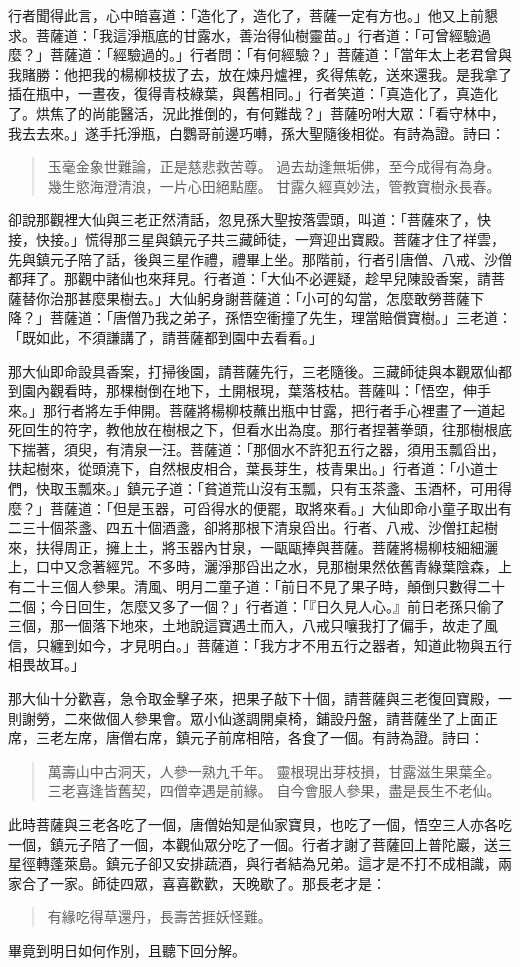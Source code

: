 行者聞得此言，心中暗喜道：「造化了，造化了，菩薩一定有方也。」他又上前懇求。菩薩道：「我這淨瓶底的甘露水，善治得仙樹靈苗。」行者道：「可曾經驗過麼？」菩薩道：「經驗過的。」行者問：「有何經驗？」菩薩道：「當年太上老君曾與我賭勝：他把我的楊柳枝拔了去，放在煉丹爐裡，炙得焦乾，送來還我。是我拿了插在瓶中，一晝夜，復得青枝綠葉，與舊相同。」行者笑道：「真造化了，真造化了。烘焦了的尚能醫活，況此推倒的，有何難哉？」菩薩吩咐大眾：「看守林中，我去去來。」遂手托淨瓶，白鸚哥前邊巧囀，孫大聖隨後相從。有詩為證。詩曰：
\begin{quote}
玉毫金象世難論，正是慈悲救苦尊。
過去劫逢無垢佛，至今成得有為身。
幾生慾海澄清浪，一片心田絕點塵。
甘露久經真妙法，管教寶樹永長春。
\end{quote}

卻說那觀裡大仙與三老正然清話，忽見孫大聖按落雲頭，叫道：「菩薩來了，快接，快接。」慌得那三星與鎮元子共三藏師徒，一齊迎出寶殿。菩薩才住了祥雲，先與鎮元子陪了話，後與三星作禮，禮畢上坐。那階前，行者引唐僧、八戒、沙僧都拜了。那觀中諸仙也來拜見。行者道：「大仙不必遲疑，趁早兒陳設香案，請菩薩替你治那甚麼果樹去。」大仙躬身謝菩薩道：「小可的勾當，怎麼敢勞菩薩下降？」菩薩道：「唐僧乃我之弟子，孫悟空衝撞了先生，理當賠償寶樹。」三老道：「既如此，不須謙講了，請菩薩都到園中去看看。」

那大仙即命設具香案，打掃後園，請菩薩先行，三老隨後。三藏師徒與本觀眾仙都到園內觀看時，那棵樹倒在地下，土開根現，葉落枝枯。菩薩叫：「悟空，伸手來。」那行者將左手伸開。菩薩將楊柳枝蘸出瓶中甘露，把行者手心裡畫了一道起死回生的符字，教他放在樹根之下，但看水出為度。那行者捏著拳頭，往那樹根底下揣著，須臾，有清泉一汪。菩薩道：「那個水不許犯五行之器，須用玉瓢舀出，扶起樹來，從頭澆下，自然根皮相合，葉長芽生，枝青果出。」行者道：「小道士們，快取玉瓢來。」鎮元子道：「貧道荒山沒有玉瓢，只有玉茶盞、玉酒杯，可用得麼？」菩薩道：「但是玉器，可舀得水的便罷，取將來看。」大仙即命小童子取出有二三十個茶盞、四五十個酒盞，卻將那根下清泉舀出。行者、八戒、沙僧扛起樹來，扶得周正，擁上土，將玉器內甘泉，一甌甌捧與菩薩。菩薩將楊柳枝細細灑上，口中又念著經咒。不多時，灑淨那舀出之水，見那樹果然依舊青綠葉陰森，上有二十三個人參果。清風、明月二童子道：「前日不見了果子時，顛倒只數得二十二個；今日回生，怎麼又多了一個？」行者道：「『日久見人心。』前日老孫只偷了三個，那一個落下地來，土地說這寶遇土而入，八戒只嚷我打了偏手，故走了風信，只纏到如今，才見明白。」菩薩道：「我方才不用五行之器者，知道此物與五行相畏故耳。」

那大仙十分歡喜，急令取金擊子來，把果子敲下十個，請菩薩與三老復回寶殿，一則謝勞，二來做個人參果會。眾小仙遂調開桌椅，鋪設丹盤，請菩薩坐了上面正席，三老左席，唐僧右席，鎮元子前席相陪，各食了一個。有詩為證。詩曰：
\begin{quote}
萬壽山中古洞天，人參一熟九千年。
靈根現出芽枝損，甘露滋生果葉全。
三老喜逢皆舊契，四僧幸遇是前緣。
自今會服人參果，盡是長生不老仙。
\end{quote}

此時菩薩與三老各吃了一個，唐僧始知是仙家寶貝，也吃了一個，悟空三人亦各吃一個，鎮元子陪了一個，本觀仙眾分吃了一個。行者才謝了菩薩回上普陀巖，送三星徑轉蓬萊島。鎮元子卻又安排蔬酒，與行者結為兄弟。這才是不打不成相識，兩家合了一家。師徒四眾，喜喜歡歡，天晚歇了。那長老才是：
\begin{quote}
有緣吃得草還丹，長壽苦捱妖怪難。
\end{quote}

畢竟到明日如何作別，且聽下回分解。
